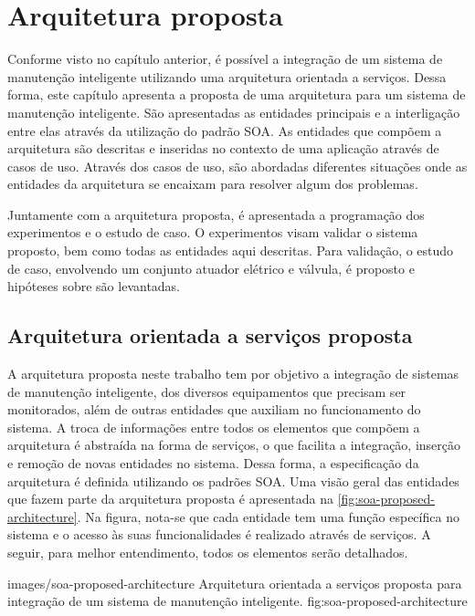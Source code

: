 \chapter{Arquitetura proposta}

Conforme visto no capítulo anterior, é possível a integração de um sistema de manutenção inteligente
utilizando uma arquitetura orientada a serviços. Dessa forma, este capítulo apresenta a proposta de
uma arquitetura para um sistema de manutenção inteligente. São apresentadas as entidades principais
e a interligação entre elas através da utilização do padrão \gls{SOA}. As entidades que compõem a
arquitetura são descritas e inseridas no contexto de uma aplicação através de casos de uso. Através
dos casos de uso, são abordadas diferentes situações onde as entidades da arquitetura se encaixam
para resolver algum dos problemas.

Juntamente com a arquitetura proposta, é apresentada a programação dos experimentos e o estudo de
caso. O experimentos visam validar o sistema proposto, bem como todas as entidades aqui descritas.
Para validação, o estudo de caso, envolvendo um conjunto atuador elétrico e válvula, é proposto e
hipóteses sobre são levantadas.


\section{Arquitetura orientada a serviços proposta}
\label{sec:arquitetura-proposta}

A arquitetura proposta neste trabalho tem por objetivo a integração de sistemas de manutenção
inteligente, dos diversos equipamentos que precisam ser monitorados, além de outras entidades que
auxiliam no funcionamento do sistema. A troca de informações entre todos os elementos que compõem a
arquitetura é abstraída na forma de serviços, o que facilita a integração, inserção e remoção de
novas entidades no sistema. Dessa forma, a especificação da arquitetura é definida utilizando os
padrões \gls{SOA}. Uma visão geral das entidades que fazem parte da arquitetura proposta é
apresentada na \cref{fig:soa-proposed-architecture}. Na figura, nota-se que cada entidade tem uma
função específica no sistema e o acesso às suas funcionalidades é realizado através de serviços. A
seguir, para melhor entendimento, todos os elementos serão detalhados.

  {images/soa-proposed-architecture}
  {Arquitetura orientada a serviços proposta para integração de um sistema de manutenção
      inteligente.}
  {fig:soa-proposed-architecture}


